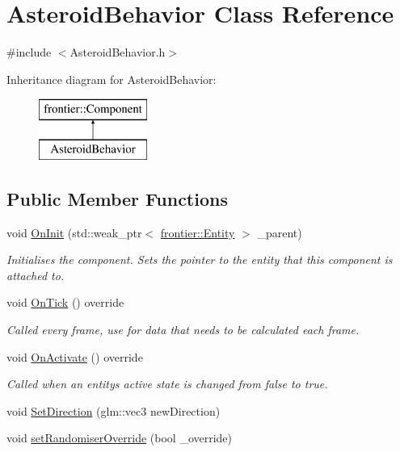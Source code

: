 \hypertarget{class_asteroid_behavior}{}\section{Asteroid\+Behavior Class Reference}
\label{class_asteroid_behavior}


{\ttfamily \#include $<$Asteroid\+Behavior.\+h$>$}

Inheritance diagram for Asteroid\+Behavior\+:\begin{figure}[H]
\begin{center}
\leavevmode
\includegraphics[height=2.000000cm]{class_asteroid_behavior}
\end{center}
\end{figure}
\subsection*{Public Member Functions}
\begin{DoxyCompactItemize}
\item 
void \hyperlink{class_asteroid_behavior_a79d9559f0d8e109e928acf7f8ff7acea}{On\+Init} (std\+::weak\+\_\+ptr$<$ \hyperlink{classfrontier_1_1_entity}{frontier\+::\+Entity} $>$ \+\_\+parent)
\begin{DoxyCompactList}\small\item\em Initialises the component. Sets the pointer to the entity that this component is attached to. \end{DoxyCompactList}\item 
void \hyperlink{class_asteroid_behavior_a3c1287599e132b49be851d9eeec6380e}{On\+Tick} () override
\begin{DoxyCompactList}\small\item\em Called every frame, use for data that needs to be calculated each frame. \end{DoxyCompactList}\item 
void \hyperlink{class_asteroid_behavior_a7c4f344a9461d1296d4dcfcd51ed3bbc}{On\+Activate} () override
\begin{DoxyCompactList}\small\item\em Called when an entity\textquotesingle{}s active state is changed from false to true. \end{DoxyCompactList}\item 
void \hyperlink{class_asteroid_behavior_ab1f0bf83f6291bda3934c1b48141908f}{Set\+Direction} (glm\+::vec3 new\+Direction)
\item 
void \hyperlink{class_asteroid_behavior_a6059686f8a09c3911187407143d3a3cf}{set\+Randomiser\+Override} (bool \+\_\+override)
\end{DoxyCompactItemize}
